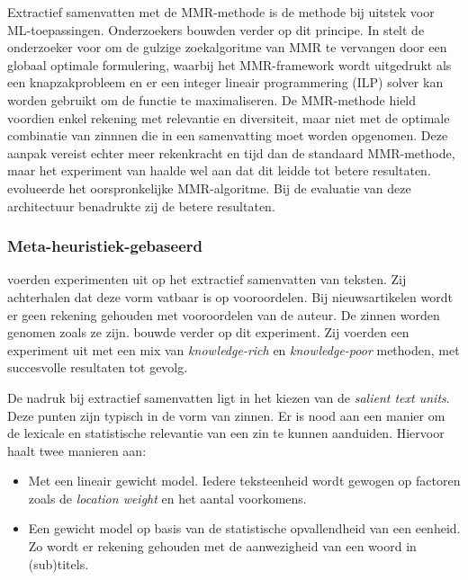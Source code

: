 Extractief samenvatten met de MMR-methode is de methode bij uitstek voor ML-toepassingen. Onderzoekers bouwden verder op dit principe. In \textcite{McDonald2007} stelt de onderzoeker voor om de gulzige zoekalgoritme van MMR te vervangen door een globaal optimale formulering, waarbij het MMR-framework wordt uitgedrukt als een knapzakprobleem en er een integer lineair programmering (ILP) solver kan worden gebruikt om de functie te maximaliseren. De MMR-methode hield voordien enkel rekening met relevantie en diversiteit, maar niet met de optimale combinatie van zinnnen die in een samenvatting moet worden opgenomen. Deze aanpak vereist echter meer rekenkracht en tijd dan de standaard MMR-methode, maar het experiment van \textcite{McDonald2007} haalde wel aan dat dit leidde tot betere resultaten. \textcite{Lin2010} evolueerde het oorspronkelijke MMR-algoritme. Bij de evaluatie van deze architectuur benadrukte zij de betere resultaten. 

\subsubsection{Meta-heuristiek-gebaseerd}



\textcite{McKeown1999} voerden experimenten uit op het extractief samenvatten van teksten. Zij achterhalen dat deze vorm vatbaar is op vooroordelen. Bij nieuwsartikelen wordt er geen rekening gehouden met vooroordelen van de auteur. De zinnen worden genomen zoals ze zijn. \textcite{Hahn2000} bouwde verder op dit experiment. Zij voerden een experiment uit met een mix van \textit{knowledge-rich} en \textit{knowledge-poor} methoden, met succesvolle resultaten tot gevolg.

De nadruk bij extractief samenvatten ligt in het kiezen van de \textit{salient text units}. Deze punten zijn typisch in de vorm van zinnen. Er is nood aan een manier om de lexicale en statistische relevantie van een zin te kunnen aanduiden. Hiervoor haalt \textcite{Hahn2000} twee manieren aan:

\begin{itemize}
	\item Met een lineair gewicht model. Iedere teksteenheid wordt gewogen op factoren zoals de \textit{location weight} en het aantal voorkomens.
	\item Een gewicht model op basis van de statistische opvallendheid van een eenheid. Zo wordt er rekening gehouden met de aanwezigheid van een woord in (sub)titels.
\end{itemize}

